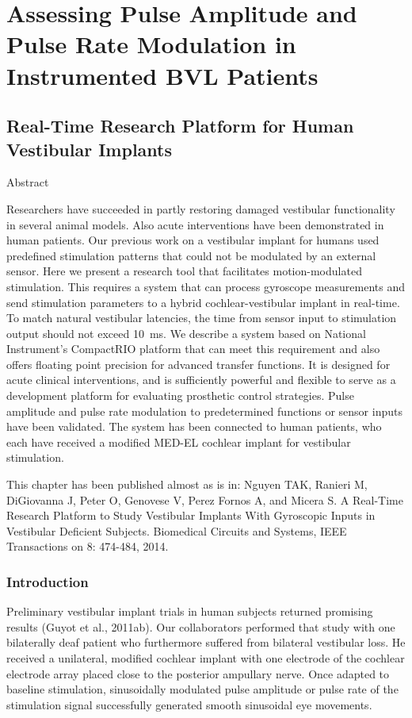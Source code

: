 \part{Assessing Pulse Amplitude and Pulse Rate Modulation in Instrumented BVL Patients}\label{part:pamprm}

\chapter{Real-Time Research Platform for Human Vestibular Implants}\label{chap:crio}
\subparagraph{Abstract} Researchers have succeeded in partly restoring damaged vestibular functionality in several animal models. Also acute interventions have  been demonstrated in human patients. Our previous work on a vestibular implant for humans used predefined stimulation patterns that could not be modulated by an external sensor. Here we present a research tool that facilitates motion-modulated stimulation. This requires a system that can process gyroscope measurements and send stimulation parameters to a hybrid cochlear-vestibular implant in real-time. To match natural vestibular latencies, the time from sensor input to stimulation output should not exceed \SI{10}{\milli\second}. We describe a system based on National Instrument’s CompactRIO platform that can meet this requirement and also offers floating point precision for advanced transfer functions. It is designed for acute clinical interventions, and is sufficiently powerful and flexible to serve as a development platform for evaluating prosthetic control strategies. Pulse amplitude and pulse rate modulation to predetermined functions or sensor inputs have been validated. The system has been connected to human patients, who each have received a modified MED-EL cochlear implant for vestibular stimulation.

{\footnotesize This chapter has been published almost as is in: Nguyen TAK, Ranieri M, DiGiovanna J, Peter O, Genovese V, Perez Fornos A, and Micera S. A Real-Time Research Platform to Study Vestibular Implants With Gyroscopic Inputs in Vestibular Deficient Subjects. Biomedical Circuits and Systems, IEEE Transactions on 8: 474-484, 2014.}

\section{Introduction}\label{sec:crio:intro}
Preliminary vestibular implant trials in human subjects returned promising results (Guyot et al., 2011ab). Our collaborators performed that study with one bilaterally deaf patient who furthermore suffered from bilateral vestibular loss. He received a unilateral, modified cochlear implant with one electrode of the cochlear electrode array placed close to the posterior ampullary nerve. Once adapted to baseline stimulation, sinusoidally modulated pulse amplitude or pulse rate of the stimulation signal successfully generated smooth sinusoidal eye movements. 
	
